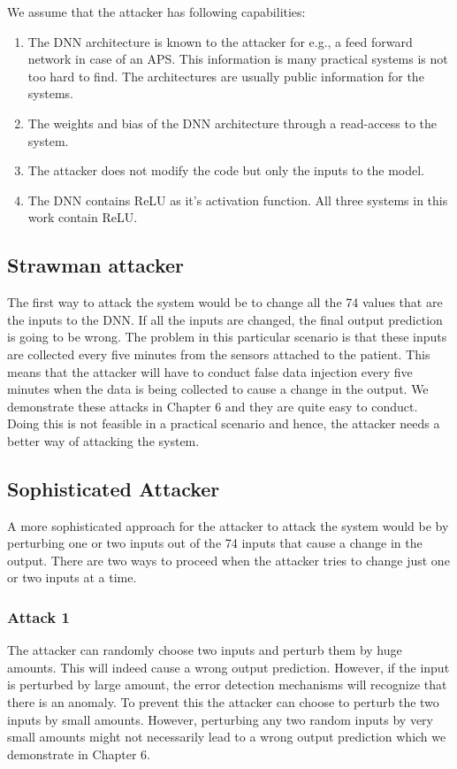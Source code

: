 We assume that the attacker has following capabilities:
\begin{enumerate}
	\item The \ac{DNN}  architecture  is known to the attacker for e.g., a feed forward  network in case of an \ac{APS}. This information is many  practical systems is not too hard to find.  The architectures are  usually public information for the systems. 
	\item  The weights and bias of the \ac{DNN}  architecture through a read-access to the system.  
	\item The attacker does not modify the code but only the inputs to the model.
	\item The \ac{DNN} contains ReLU as it's activation function. 
	All three systems in this work contain ReLU.
\end{enumerate}

\subsection{Strawman attacker}
The first way to attack the system would be to change all the 74 values that are the inputs to the DNN.
 If all the inputs are changed, the final output prediction is going to be wrong. The problem in this particular scenario is that these inputs are collected every five minutes from the sensors attached to the patient. 
 This means that the attacker will have to conduct false data injection every five minutes when the data is being collected to cause a change in the output.
 We demonstrate these attacks in Chapter 6 and they are quite easy to conduct.  
  Doing this is not feasible in a practical scenario and hence, the attacker needs a better way of attacking the system. 

\subsection{Sophisticated Attacker}
A more sophisticated approach for the attacker to attack the system would be by perturbing one or two inputs out of the 74 inputs that cause a change in the output. There are two ways to proceed when the attacker tries to change just one or two inputs at a time. 

\subsubsection{Attack 1}
The attacker can randomly choose two inputs and perturb them by huge amounts. 
This will indeed cause a wrong output prediction. 
However, if the input is perturbed by large amount, the error detection mechanisms will recognize that there is an anomaly. 
To prevent this the attacker can choose to perturb the two inputs by small amounts. 
However, perturbing any two random inputs by very small amounts might not necessarily lead to a wrong output prediction which we demonstrate in Chapter 6. 

